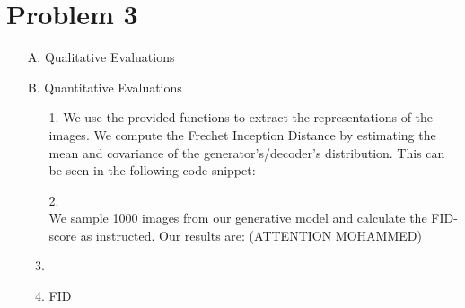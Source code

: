 \section*{Problem 3}
\begin{itemize}
\item[A.] {Qualitative Evaluations}\\

    \item [B.] {Quantitative Evaluations}\\
    \begin{enumerate}
        \item[1.]
       We use the provided functions to extract the representations of the images. We compute the Frechet Inception Distance by estimating the mean and covariance of the generator's/decoder's distribution. This can be seen in the following code snippet:
    
        \item[2.] \\
        We sample 1000 images from our generative model and calculate the FID-score as instructed. Our results are: (ATTENTION MOHAMMED)
        \item
        \item FID
        
    \end{enumerate}
\end{itemize}

